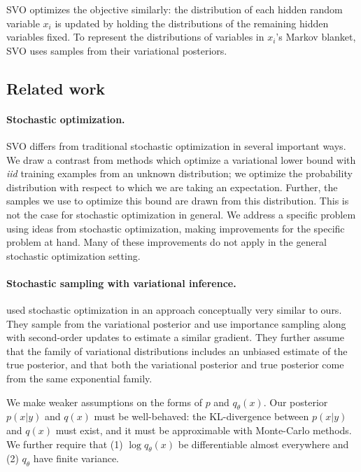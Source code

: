 SVO optimizes the objective similarly: the distribution of each hidden
random variable $x_i$ is updated by holding the distributions of the
remaining hidden variables fixed.  To represent the distributions of
variables in $x_i$'s Markov blanket, SVO uses samples from their
variational posteriors.

\subsection{Related work}

\paragraph{Stochastic optimization.}
SVO differs from traditional stochastic optimization in several
important ways.  We draw a contrast from methods which optimize a
variational lower bound with \emph{iid} training examples
\cite{hoffman:2010} from an unknown distribution; we optimize the
probability distribution with respect to which we are taking an
expectation.  Further, the samples we use to optimize this bound are
drawn from this distribution.  This is not the case for stochastic
optimization in general.
We address a specific problem using ideas from stochastic
optimization, making improvements for the specific problem at hand.
Many of these improvements do not apply in the general stochastic
optimization setting.

\paragraph{Stochastic sampling with variational inference.}
\citet{carbonetto:2009} used stochastic optimization in an approach
conceptually very similar to ours.  They sample from the variational
posterior and use importance sampling along with second-order updates
to estimate a similar gradient.  They further
assume that the family of variational distributions includes an
unbiased estimate of the true posterior, and that both the variational
posterior and true posterior come from the same exponential family.

We make weaker assumptions on the forms of $p$ and $q_\theta(x)$. Our
posterior $p(x | y)$ and $q(x)$ must be well-behaved: the
KL-divergence between $p(x | y)$ and $q(x)$ must exist, and it must be
approximable with Monte-Carlo methods.  We further require that (1)
$\log q_\theta(x)$ be differentiable almost everywhere and (2)
$q_\theta$ have finite variance.

